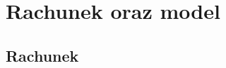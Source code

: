 \documentclass{beamer}
\begin{document}



\section{Rachunek oraz model}
\subsection{Rachunek}
\end{document}
